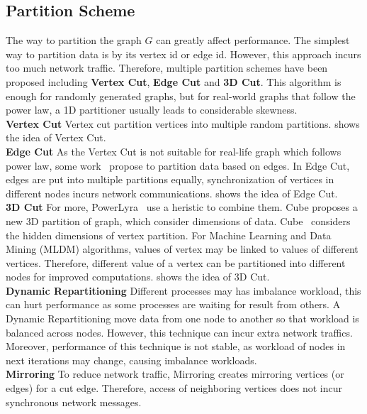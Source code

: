 \subsection{Partition Scheme}
The way to partition the graph $G$ can greatly affect performance.
The simplest way to partition data is by its vertex id or edge id.
However, this approach incurs too much network traffic. Therefore,
multiple partition schemes have been proposed including \textbf{Vertex Cut},
\textbf{Edge Cut} and \textbf{3D Cut}.
This algorithm is enough for randomly generated
graphs, but for real-world graphs that follow the
power law, a 1D partitioner usually leads to considerable
skewness.\\
\textbf{Vertex Cut} Vertex cut partition vertices into multiple
random partitions.  shows the idea of Vertex Cut. \\
\textbf{Edge Cut} As the Vertex Cut is not suitable for real-life
graph which follows power law, some work~\cite{xstream} propose to partition
data based on edges. In Edge Cut, edges are put into multiple
partitions equally, synchronization of vertices in different nodes
incurs network communications.  shows the idea of
Edge Cut. \\
\textbf{3D Cut}
For more, PowerLyra~\cite{powerlyra} use a heristic to combine them.
Cube proposes a new 3D partition of graph, which consider dimensions of data.
Cube~\cite{cube:osdi16} considers the hidden dimensions of vertex partition.
For Machine Learning and Data Mining (MLDM) algorithms, values of vertex
may be linked to values of different vertices. Therefore, different value of a vertex
can be partitioned into different nodes for improved computations. 
shows the idea of 3D Cut. \\
\textbf{Dynamic Repartitioning}
Different processes may has imbalance workload, this can hurt performance
as some processes are waiting for result from others. A Dynamic Repartitioning
move data from one node to another so that workload is balanced across
nodes. However, this technique can incur extra network traffics. Moreover,
performance of this technique is not stable, as workload of nodes in next
iterations may change, causing imbalance workloads.\\
\textbf{Mirroring}
To reduce network traffic, Mirroring creates mirroring vertices (or edges)
for a cut edge. Therefore, access of neighboring vertices does not
incur synchronous network messages.

